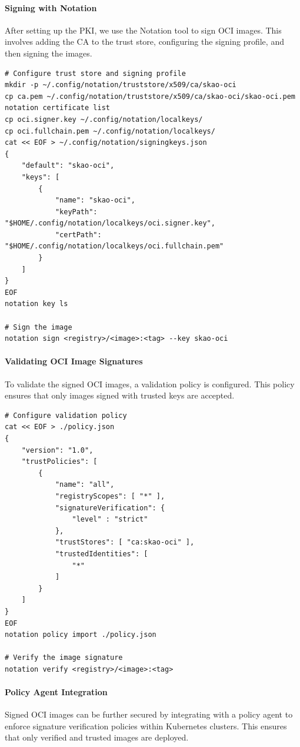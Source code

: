 \documentclass[a4paper]{spie}  %
\begin{document}
\paragraph{Signing with Notation}
After setting up the PKI, we use the Notation tool to sign OCI images. This involves adding the CA to the trust store, configuring the signing profile, and then signing the images.

\begin{lstlisting}
# Configure trust store and signing profile
mkdir -p ~/.config/notation/truststore/x509/ca/skao-oci
cp ca.pem ~/.config/notation/truststore/x509/ca/skao-oci/skao-oci.pem
notation certificate list
cp oci.signer.key ~/.config/notation/localkeys/
cp oci.fullchain.pem ~/.config/notation/localkeys/
cat << EOF > ~/.config/notation/signingkeys.json
{
    "default": "skao-oci",
    "keys": [
        {
            "name": "skao-oci",
            "keyPath": "$HOME/.config/notation/localkeys/oci.signer.key",
            "certPath": "$HOME/.config/notation/localkeys/oci.fullchain.pem"
        }
    ]
}
EOF
notation key ls

# Sign the image
notation sign <registry>/<image>:<tag> --key skao-oci
\end{lstlisting}

\paragraph{Validating OCI Image Signatures}
To validate the signed OCI images, a validation policy is configured. This policy ensures that only images signed with trusted keys are accepted.

\begin{lstlisting}
# Configure validation policy
cat << EOF > ./policy.json
{
    "version": "1.0",
    "trustPolicies": [
        {
            "name": "all",
            "registryScopes": [ "*" ],
            "signatureVerification": {
                "level" : "strict"
            },
            "trustStores": [ "ca:skao-oci" ],
            "trustedIdentities": [
                "*"
            ]
        }
    ]
}
EOF
notation policy import ./policy.json

# Verify the image signature
notation verify <registry>/<image>:<tag>
\end{lstlisting}

\paragraph{Policy Agent Integration}
Signed OCI images can be further secured by integrating with a policy agent to enforce signature verification policies within Kubernetes clusters. This ensures that only verified and trusted images are deployed.
\end{document}
